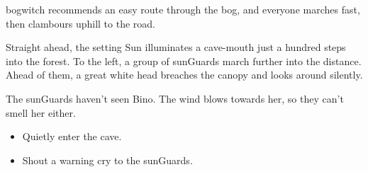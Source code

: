 \Gls{bogwitch} recommends an easy route through the bog, and everyone marches fast, then clambours uphill to the road.


Straight ahead, the setting Sun illuminates a cave-mouth just a hundred \glspl{step} into the forest.
To the left, a group of \glspl{sunGuard} march further into the distance.
Ahead of them, a great white head breaches the canopy and looks around silently.

The \glspl{sunGuard} haven't seen Bino.
The wind blows towards her, so they can't smell her either.

\begin{itemize}
  \item
  Quietly enter the cave.
  \item
  Shout a warning cry to the \glspl{sunGuard}.
\end{itemize}

